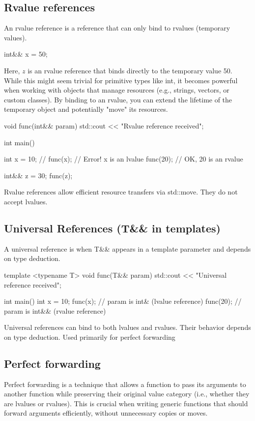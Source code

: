 \documentclass{report}
\begin{document}
\pagebreak 
{}
\bigbreak \noindent 
\subsection{Rvalue references}
\bigbreak \noindent 
An rvalue reference is a reference that can only bind to rvalues (temporary values).
\bigbreak \noindent 
\begin{cppcode}
int&& x = 50;
\end{cppcode}
\bigbreak \noindent 
Here, $z$ is an rvalue reference that binds directly to the temporary value 50. While this might seem trivial for primitive types like int, it becomes powerful when working with objects that manage resources (e.g., strings, vectors, or custom classes). By binding to an rvalue, you can extend the lifetime of the temporary object and potentially "move" its resources.
\bigbreak \noindent 
\begin{cppcode}
void func(int&& param) {
    std::cout << "Rvalue reference received\n";
}

int main() {
    int x = 10;
    // func(x);  // Error! x is an lvalue
    func(20);    //  OK, 20 is an rvalue
    
    int&& z = 30;
    func(z);
}
\end{cppcode}
\bigbreak \noindent 
Rvalue references allow efficient resource transfers via std::move. They do not accept lvalues.
\bigbreak \noindent 
\subsection{Universal References (T\&\& in templates)}
\bigbreak \noindent 
A universal reference is when T\&\& appears in a template parameter and depends on type deduction.
\bigbreak \noindent 
\begin{cppcode}
    template <typename T>
    void func(T&& param) {
        std::cout << "Universal reference received\n";
    }

    int main() {
        int x = 10;
        func(x);   //  param is int& (lvalue reference)
        func(20);  //  param is int&& (rvalue reference)
    }
\end{cppcode}
\bigbreak \noindent 
Universal references can bind to both lvalues and rvalues. Their behavior depends on type deduction. Used primarily for perfect forwarding

\bigbreak \noindent 
\subsection{Perfect forwarding}
\bigbreak \noindent 
Perfect forwarding is a technique that allows a function to pass its arguments to another function while preserving their original value category (i.e., whether they are lvalues or rvalues).
\bigbreak \noindent 
This is crucial when writing generic functions that should forward arguments efficiently, without unnecessary copies or moves.
\bigbreak \noindent 
\end{document}
